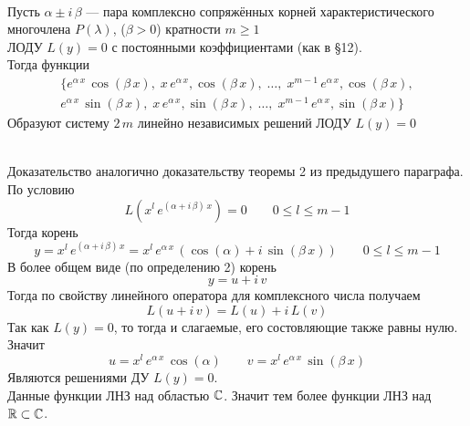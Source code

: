\begin{Th}~\\
    Пусть $\alpha \pm i\,\beta$  --- пара комплексно сопряжённых корней характеристического многочлена $P(\lambda)$, ($\beta > 0$) кратности $m \geqslant 1$\\ ЛОДУ $L(y) = 0$ с постоянными коэффициентами (как в \S 12).\\
    Тогда функции 
    \begin{multline*}
        \{e^{\alpha\,x}\,\cos(\beta\,x),\; x\,e^{\alpha\,x},\cos(\beta\,x),\; \dots,\; x^{m-1}\,e^{\alpha\,x},\cos(\beta\,x),\\ e^{\alpha\,x}\,\sin(\beta\,x),\; x\,e^{\alpha\,x},\sin(\beta\,x),\; \dots,\; x^{m-1}\,e^{\alpha\,x},\sin(\beta\,x)\}
    \end{multline*}
    Образуют систему $2\,m$ линейно независимых решений ЛОДУ $L(y) = 0$
\end{Th}

\begin{Proof}~\\
    Доказательство аналогично доказательству теоремы 2 из предыдушего параграфа.\\
    По условию
    \[
        L(x^l\,e^{(\alpha + i\,\beta)\,x}) = 0 \qquad 0 \leqslant l \leqslant m - 1
    \]
    Тогда корень
    \[
        y = x^l\,e^{(\alpha + i\,\beta)\,x} = x^l\,e^{\alpha\,x}\,(\cos(\alpha) + i\,\sin(\beta\,x)) \qquad 0 \leqslant l \leqslant m - 1
    \]
    В более общем виде (по определению 2) корень
    \[
        y = u + i\,v
    \]
    Тогда по свойству линейного оператора для комплексного числа получаем
    \[
        L(u + i\,v) = L(u) + i\,L(v)
    \]
    Так как $L(y) = 0$, то тогда и слагаемые, его состовляющие также равны нулю. Значит
    \[
        u = x^l\,e^{\alpha\,x}\,\cos(\alpha) \qquad v = x^l\,e^{\alpha\,x}\,\sin(\beta\,x)
    \]
    Являются решениями ДУ $L(y) = 0$.\\
    Данные функции ЛНЗ над областью $\mathbb{C}$. Значит тем более функции ЛНЗ над $\mathbb{R} \subset \mathbb{C}$.
\end{Proof}

